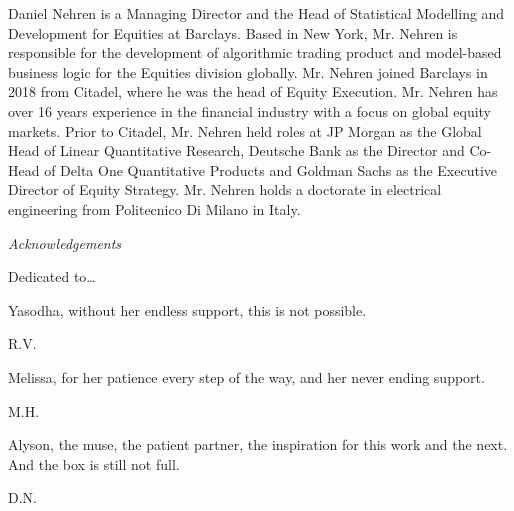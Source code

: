 \noindent Daniel Nehren is a Managing Director and the Head of Statistical Modelling and Development for Equities at Barclays. Based in New York, Mr. Nehren is responsible for the development of algorithmic trading product and model-based business logic for the Equities division globally. Mr. Nehren joined Barclays in 2018 from Citadel, where he was the head of Equity Execution. Mr. Nehren has over 16 years experience in the financial industry with a focus on global equity markets. Prior to Citadel, Mr. Nehren held roles at JP Morgan as the Global Head of Linear Quantitative Research, Deutsche Bank as the Director and Co-Head of Delta One Quantitative Products and Goldman Sachs as the Executive Director of Equity Strategy. Mr. Nehren holds a doctorate in electrical engineering from Politecnico Di Milano in Italy.



\newpage



{\itshape \large Acknowledgements} \vspace{0.5cm}


Dedicated to\dots \vspace{0.5cm}


\begin{minipage}[t]{0.8\textwidth}
	\raggedright
		Yasodha, without her endless support, this is not possible. \par
  	\raggedleft
  	R.V.
\end{minipage} \vspace{1cm}


\begin{minipage}[t]{0.8\textwidth}
	\raggedright
		Melissa, for her patience every step of the way, and her never ending support. \par
  	\raggedleft
  	M.H.
\end{minipage} \vspace{1cm}


\begin{minipage}[t]{0.8\textwidth}
	\raggedright
		Alyson, the muse, the patient partner, the inspiration for this work and the next. And the box is still not full. \par
  	\raggedleft
  	D.N.
\end{minipage} 